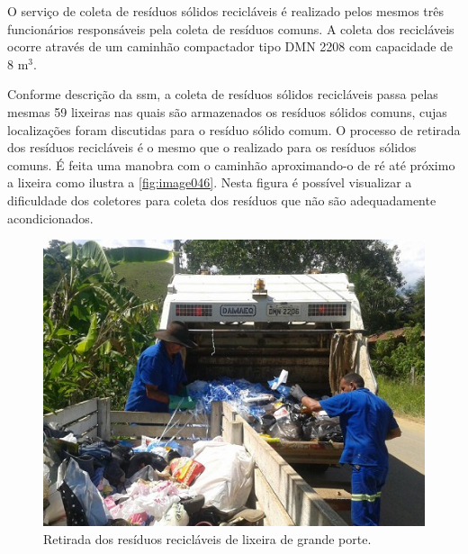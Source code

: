 	O serviço de coleta de resíduos sólidos recicláveis é realizado pelos mesmos três funcionários responsáveis pela coleta de resíduos comuns. A coleta dos recicláveis ocorre através de um caminhão compactador tipo DMN 2208 com capacidade de 8 m$^{3}$.
		

		
	Conforme descrição da \gls{ssm}, a coleta de resíduos sólidos recicláveis passa pelas mesmas 59 lixeiras nas quais são armazenados os resíduos sólidos comuns, cujas localizações foram discutidas para o resíduo sólido comum.
	O processo de retirada dos resíduos recicláveis é o mesmo que o realizado para os resíduos sólidos comuns. É feita uma manobra com o caminhão aproximando-o de ré até próximo a lixeira como ilustra a \autoref{fig:image046}. Nesta figura é possível visualizar a dificuldade dos coletores para coleta dos resíduos que não são adequadamente acondicionados.
	
	\begin{figure}
		\centering
		\includegraphics[width=0.7\linewidth]{produtos/prodtres/image046}
		\caption{Retirada dos resíduos recicláveis de lixeira de grande porte.}
		\label{fig:image046}
	\end{figure}
	
